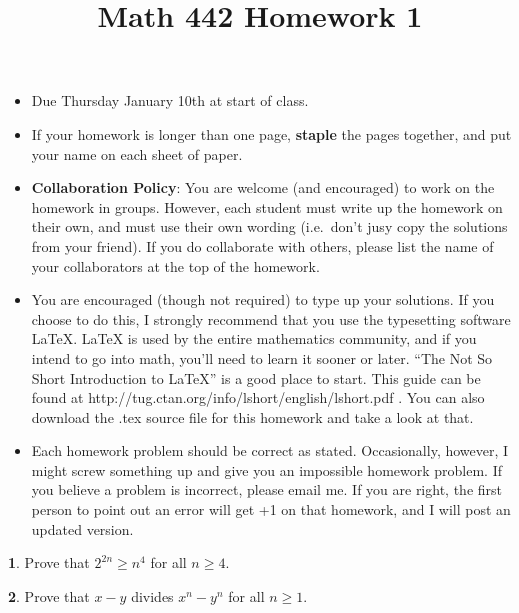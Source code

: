 \documentclass[12pt]{article}
\title{Math 442 Homework 1}
\date{}
\theoremstyle{definition}
\newtheorem{problem}{}
\begin{document}
%
%
\maketitle
%
\vspace{-16 mm}
\begin{itemize}
\item Due Thursday January 10th at start of class.
%
\item If your homework is longer than one page, {\bf staple} the pages together, and put your name on each sheet of paper.
%
\item {\bf Collaboration Policy}: You are welcome (and encouraged) to work on the homework in groups. However, each student must write up the homework on their own, and must use their own wording (i.e.~don't jusy copy the solutions from your friend). If you do collaborate with others, please list the name of your collaborators at the top of the homework.

\item You are encouraged (though not required) to type up your solutions. If you choose to do this, I strongly recommend that you use the typesetting software LaTeX. LaTeX is used by the entire mathematics community, and if you intend to go into math, you’ll need to learn it sooner or later. ``The Not So Short Introduction to LaTeX'' is a good place to start. This guide can be found at http://tug.ctan.org/info/lshort/english/lshort.pdf . You can also download the .tex source file for this homework and take a look at that.

\item Each homework problem should be correct as stated. Occasionally, however, I might screw something up and give you an impossible homework problem. If you believe a problem is incorrect, please email me. If you are right, the first person to point out an error will get +1 on that homework, and I will post an updated version. 
\end{itemize}





\begin{problem}
Prove that $2^{2n} \geq n^4$ for all $n\geq4$.
\end{problem}

\begin{problem}
Prove that $x-y$ divides $x^n-y^n$ for all $n\geq 1$.
\end{problem}
\end{document}
